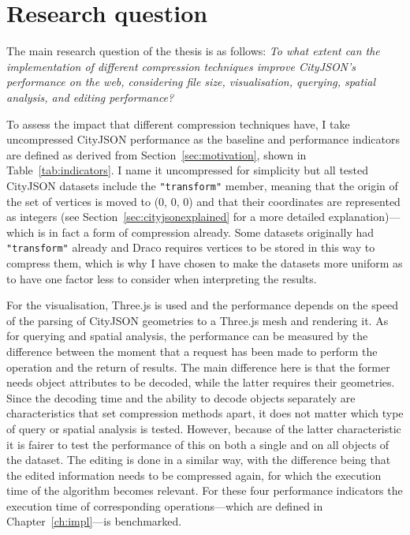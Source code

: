 \section{Research question}
\label{sec:researchq}

The main research question of the thesis is as follows:
\textit{To what extent can the implementation of different compression techniques improve CityJSON’s performance on the web, considering file size, visualisation, querying, spatial analysis, and editing performance?}


To assess the impact that different compression techniques have, I take uncompressed CityJSON performance as the baseline and performance indicators are defined as derived from Section~\ref{sec:motivation}, shown in Table~\ref{tab:indicators}.
I name it uncompressed for simplicity but all tested CityJSON datasets include the \texttt{"transform"} member, meaning that the origin of the set of vertices is moved to (0, 0, 0) and that their coordinates are represented as integers (see Section~\ref{sec:cityjsonexplained} for a more detailed explanation)---which is in fact a form of compression already.
Some datasets originally had \texttt{"transform"} already and Draco requires vertices to be stored in this way to compress them, which is why I have chosen to make the datasets more uniform as to have one factor less to consider when interpreting the results.

For the visualisation, Three.js is used and the performance depends on the speed of the parsing of CityJSON geometries to a Three.js mesh and rendering it.
As for querying and spatial analysis, the performance can be measured by the difference between the moment that a request has been made to perform the operation and the return of results.
The main difference here is that the former needs object attributes to be decoded, while the latter requires their geometries.
Since the decoding time and the ability to decode objects separately are characteristics that set compression methods apart, it does not matter which type of query or spatial analysis is tested.
However, because of the latter characteristic it is fairer to test the performance of this on both a single and on all objects of the dataset.
The editing is done in a similar way, with the difference being that the edited information needs to be compressed again, for which the execution time of the algorithm becomes relevant.
For these four performance indicators the execution time of corresponding operations---which are defined in Chapter~\ref{ch:impl}---is benchmarked.


